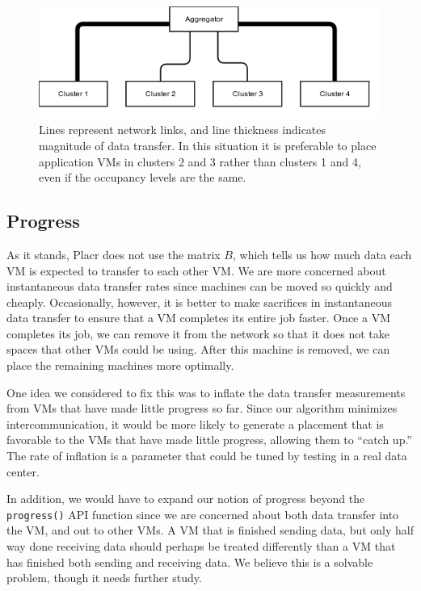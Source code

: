 \documentclass[11pt]{article}
\begin{document}
\begin{figure}
  \centering
\includegraphics[scale=0.7]{cluster_congestion.png}

 \caption{Lines represent network links, and line thickness indicates magnitude of data transfer.  In this situation it is preferable to place application VMs in clusters 2 and 3 rather than clusters 1 and 4, even if the occupancy levels are the same.}

 \label{fig:cluster_congestion}
 
\end{figure}
 
 
\subsection{Progress}

As it stands, Placr does not use the matrix $B$, which tells us how much data each VM is expected to transfer to each other VM. We are more concerned about instantaneous data transfer rates since machines can be moved so quickly and cheaply.  Occasionally, however, it is better to make sacrifices in instantaneous data transfer to ensure that a VM completes its entire job faster.  Once a VM completes its job, we can remove it from the network so that it does not take spaces that other VMs could be using.  After this machine is removed, we can place the remaining machines more optimally.

One idea we considered to fix this was to inflate the data transfer measurements from VMs that have made little progress so far.  Since our algorithm minimizes intercommunication, it would be more likely to generate a placement that is favorable to the VMs that have made little progress, allowing them to ``catch up.''  The rate of inflation is a parameter that could be tuned by testing in a real data center.

In addition, we would have to expand our notion of progress beyond the \texttt{progress()} API function since we are concerned about both data transfer into the VM, and out to other VMs.  A VM that is finished sending data, but only half way done receiving data should perhaps be treated differently than a VM that has finished both sending and receiving data.  We believe this is a solvable problem, though it needs further study.
\end{document}
